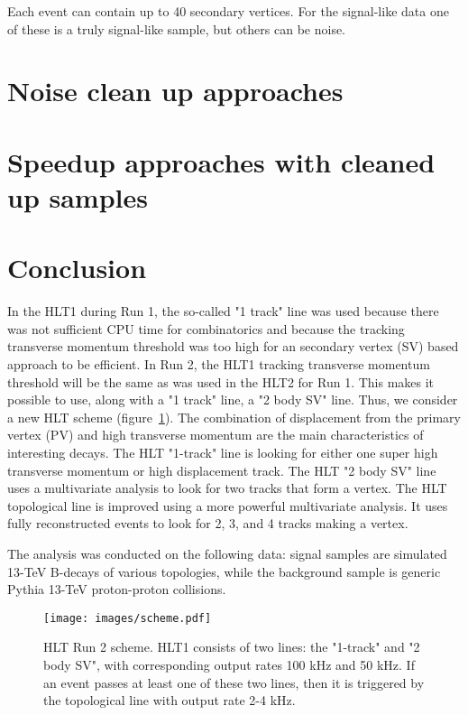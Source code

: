 \documentclass{llncs}
\begin{document}
Each event can contain up to 40 secondary vertices. For the signal-like data one of these is a truly signal-like sample, but others can be noise.

\section{Noise clean up approaches}

\section{Speedup approaches with cleaned up samples}

\section{Conclusion}

In the HLT1 during Run 1, the so-called  "1 track" line was used because there was not sufficient CPU time for combinatorics and because the tracking transverse momentum threshold was too high for an secondary vertex (SV) based approach to be efficient. In Run 2, the HLT1 tracking transverse momentum threshold will be the same as was used in the HLT2 for Run 1.  This makes it possible to use, along with a "1 track" line, a "2 body SV" line. Thus, we consider a new HLT scheme (figure~\ref{scheme}). The combination of displacement from the primary vertex (PV) and high transverse momentum are the main characteristics of interesting decays. The HLT "1-track" line is looking for either one super high transverse momentum or high displacement track. The HLT "2 body SV" line uses a multivariate analysis to look for two tracks that form a vertex. The HLT topological line is improved using a more powerful multivariate analysis. It uses fully reconstructed events to look for 2, 3, and 4 tracks making a vertex.

The analysis was conducted on the following data: signal samples are simulated 13-TeV B-decays of various topologies, while the background sample is generic Pythia 13-TeV proton-proton collisions.

\begin{figure}[h]
\texttt{[image: images/scheme.pdf]}\hspace{2pc}%
\begin{minipage}[b]{20pc}\caption{\label{scheme} HLT Run 2 scheme. HLT1 consists of two lines: the "1-track" and "2 body SV", with corresponding output rates 100 kHz and 50 kHz. If an event passes at least one of these two lines, then it is triggered by the topological line with output rate 2-4 kHz.}
\end{minipage}
\end{figure}
\end{document}
